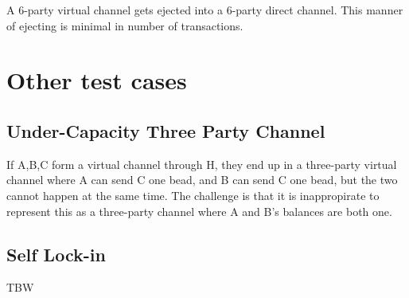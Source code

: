 \documentclass{article}
\begin{document}
\begin{figure}[H]
    \centering
\end{figure}

A 6-party virtual channel gets ejected into a 6-party direct channel. This manner of ejecting is minimal in number of transactions.

\section*{Other test cases}

\subsection*{Under-Capacity Three Party Channel}

\begin{figure}[H]
    \centering
\end{figure}

If A,B,C form a virtual channel through H, they end up in a three-party virtual channel where A can send C one bead, and B can send C one bead, but the two cannot happen at the same time. The challenge is that it is inappropirate to represent this as a three-party channel where A and B's balances are both one.

\subsection*{Self Lock-in}

TBW
\end{document}
